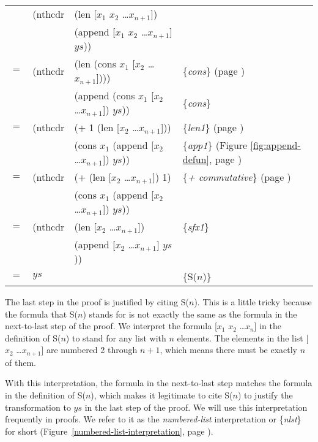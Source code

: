 \begin{center}
\begin{tabular}{llll}
    & (nthcdr & (len [$x_1$ $x_2$ \dots $x_{n+1}$])                 & \\
    &         & (append [$x_1$ $x_2$ \dots $x_{n+1}$] $ys$))        & \\
$=$ & (nthcdr & (len (cons $x_1$ [$x_2$ \dots $x_{n+1}$])))         & \{\emph{cons}\} (page \pageref{first-rest-cons}) \\
    &         & (append (cons $x_1$ [$x_2$ \dots $x_{n+1}$]) $ys$)) & \{\emph{cons}\}                                \\
$=$ & (nthcdr & (+ 1 (len [$x_2$ \dots $x_{n+1}$]))                 & \{\emph{len1}\} (page \pageref{len-equations})       \\
    &         & (cons $x_1$ (append [$x_2$ \dots $x_{n+1}$]) $ys$)) & \{\emph{app1}\} (Figure \ref{fig:append-defun}, page \pageref{fig:append-defun})\\
$=$ & (nthcdr & (+ (len [$x_2$ \dots $x_{n+1}$]) 1)                 & \{\emph{+ commutative}\} (page \pageref{fig-02-01})  \\
    &         & (cons $x_1$ (append [$x_2$ \dots $x_{n+1}$]) $ys$)) &                                                      \\
$=$ & (nthcdr & (len [$x_2$ \dots $x_{n+1}$])                       & \{\emph{sfx1}\}                                      \\
    &         & (append [$x_2$ \dots $x_{n+1}$] $ys$))              &                                                      \\
$=$ & $ys$    &                                                     & \{S($n$)\}                                           \\
\end{tabular}
\end{center}

The last step in the proof is justified by citing S($n$).
This is a little tricky because the formula that S($n$)
stands for is not exactly the same as the formula in the next-to-last step of the proof.
We interpret the formula [$x_1$ $x_2$ \dots $x_n$] in the definition of S($n$)
to stand for any list with $n$ elements.
The elements in the list [$x_2$ \dots $x_{n+1}$] are numbered 2 through $n+1$,
which means there must be exactly $n$ of them.

With this interpretation, the formula in the next-to-last step
matches the formula in the definition of S($n$),
which makes it legitimate to cite S($n$) to justify
the transformation to $ys$ in the last step of the proof.
We will use this interpretation frequently in proofs.
We refer to it as the \emph{numbered-list} interpretation
or \{\emph{nlst}\} for short
(Figure~\ref{numbered-list-interpretation}, page \pageref{numbered-list-interpretation}).

